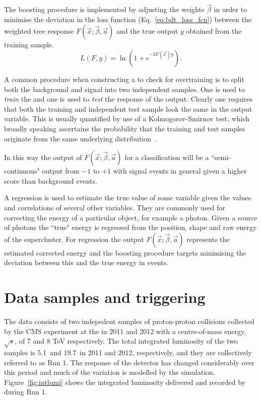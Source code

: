 The boosting procedure is implemented by adjusting the weights $\vec{\beta}$ in order to minimise the deviation in the loss function (Eq.~\ref{eq:bdt_loss_fcn}) between the weighted tree response $F(\vec{x};\vec{\beta},\vec{a})$ and the true output $y$ obtained from the training sample. 
\begin{equation}
  L(F,y) = \ln(1+e^{-2F(\vec{x})y}).
  \label{eq:bdt_loss_fcn}
\end{equation}

A common procedure when constructing a \BDT to check for overtraining is to split both the background and signal into two independent samples. One is used to \emph{train} the \BDT and one is used to \emph{test} the response of the output. Clearly one requires that both the training and independent test sample look the same in the output variable. This is usually quantified by use of a Kolmogorov-Smirnov test, which broadly speaking ascertains the probability that the training and test samples originate from the same underlying distribution~\cite{kol_smir}. 

In this way the output of $F(\vec{x};\vec{\beta},\vec{a})$ for a classification \BDT will be a ``semi-continuous" output from $-1$ to $+1$ with signal events in general given a higher score than background events.

A regression \BDT is used to estimate the true value of some variable given the values and correlations of several other variables. They are commonly used for correcting the energy of a particular object, for example a photon. Given a \MC source of photons the ``true" energy is regressed from the position, shape and raw energy of the supercluster. For regression \BDTs the output $F(\vec{x};\vec{\beta},\vec{a})$ represents the estimated corrected energy and the boosting procedure targets minimising the deviation between this and the true energy in \MC events. 

\section{Data samples and triggering}

The data consists of two indepedent samples of proton-proton collisions collected by the CMS experiment at the \LHC in 2011 and 2012 with a centre-of-mass energy, $\sqrt{s}$, of 7 and 8 TeV respectively. The total integrated luminosity of the two samples is 5.1~\fb and 19.7~\fb in 2011 and 2012, respectively, and they are collectively referred to as \LHC Run 1. The response of the detector has changed considerably over this period and much of the variation is modelled by the \MC simulation. Figure~\ref{fig:intlumi} shows the integrated luminosity delivered and recorded by \CMS during \LHC Run 1.

